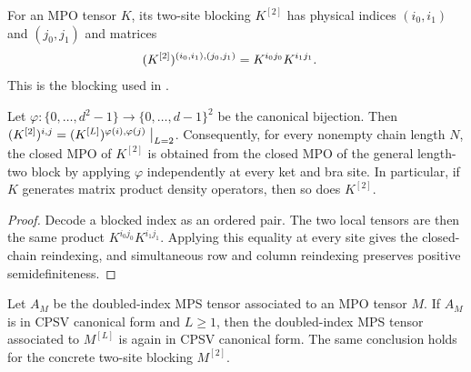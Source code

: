 \begin{definition}
    \label{def:mpdo_two_site_blocking}
    \leanok
    For an MPO tensor $K$, its two-site blocking $K^{[2]}$ has physical
    indices $(i_0,i_1)$ and $(j_0,j_1)$ and matrices
    \begin{align}
        (K^{[2]})^{(i_0,i_1),(j_0,j_1)}
         & =K^{i_0j_0}K^{i_1j_1}.
        \notag
    \end{align}
    This is the blocking used in
    \cite[Theorem~4.9, lines~851--856]{Cirac2016MPDO_arXiv}.
\end{definition}

\begin{lemma}
    \label{thm:mpdo_block_two_as_positive_blocking}
    \leanok
    Let $\varphi:\{0,\ldots,d^2-1\}\to
        \{0,\ldots,d-1\}^2$ be the canonical bijection. Then
    $(K^{[2]})^{i,j}
        =(K^{[L]})^{\varphi(i),\varphi(j)}\bigm|_{L=2}$.
    Consequently, for every nonempty chain length $N$, the closed MPO of
    $K^{[2]}$ is obtained from the closed MPO of the general length-two block by
    applying $\varphi$ independently at every ket and bra site. In
    particular, if $K$ generates matrix product density operators, then so
    does $K^{[2]}$.
\end{lemma}

\begin{proof}\leanok
    Decode a blocked index as an ordered pair. The two local tensors are
    then the same product $K^{i_0j_0}K^{i_1j_1}$. Applying this equality at
    every site gives the closed-chain reindexing, and simultaneous row and
    column reindexing preserves positive semidefiniteness.
\end{proof}

\begin{lemma}
    \label{thm:mpdo_literal_cpsv_positive_blocking}
    \leanok
    Let $A_M$ be the doubled-index MPS tensor associated to an MPO tensor
    $M$. If $A_M$ is in CPSV canonical form and $L\geq1$, then the
    doubled-index MPS tensor associated to $M^{[L]}$ is again in CPSV
    canonical form. The same conclusion holds for the concrete two-site
    blocking $M^{[2]}$.
\end{lemma}

